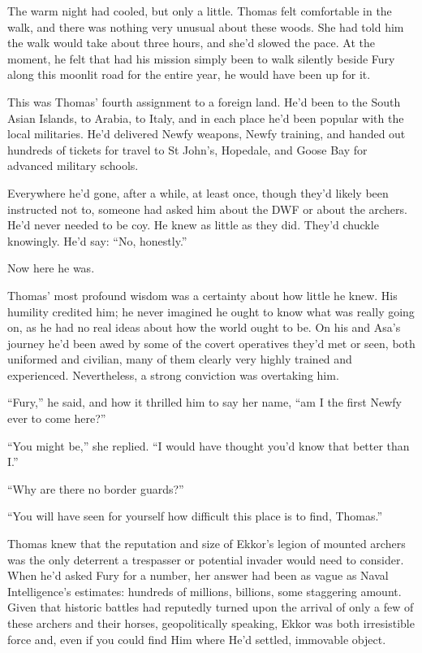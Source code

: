 \documentclass[11pt,a5paper]{article}
\begin{document}
The warm night had cooled, but only a little. Thomas felt comfortable in the walk, and there was nothing very unusual about these woods. She had told him the walk would take about three hours, and she'd slowed the pace. At the moment, he felt that had his mission simply been to walk silently beside Fury along this moonlit road for the entire year, he would have been up for it.

This was Thomas' fourth assignment to a foreign land. He'd been to the South Asian Islands, to Arabia, to Italy, and in each place he'd been popular with the local militaries. He'd delivered Newfy weapons, Newfy training, and handed out hundreds of tickets for travel to St John's, Hopedale, and Goose Bay for advanced military schools.

Everywhere he'd gone, after a while, at least once, though they'd likely been instructed not to, someone had asked him about the DWF or about the archers. He'd never needed to be coy. He knew as little as they did. They'd chuckle knowingly. He'd say: ``No, honestly.''

Now here he was.

Thomas' most profound wisdom was a certainty about how little he knew. His humility credited him; he never imagined he ought to know what was really going on, as he had no real ideas about how the world ought to be. On his and Asa's journey he'd been awed by some of the covert operatives they'd met or seen, both uniformed and civilian, many of them clearly very highly trained and experienced. Nevertheless, a strong conviction was overtaking him.

``Fury,'' he said, and how it thrilled him to say her name, ``am I the first Newfy ever to come here?''

``You might be,'' she replied. ``I would have thought you'd know that better than I.''

``Why are there no border guards?''

``You will have seen for yourself how difficult this place is to find, Thomas.''

Thomas knew that the reputation and size of Ekkor's legion of mounted archers was the only deterrent a trespasser or potential invader would need to consider. When he'd asked Fury for a number, her answer had been as vague as Naval Intelligence's estimates: hundreds of millions, billions, some staggering amount. Given that historic battles had reputedly turned upon the arrival of only a few of these archers and their horses, geopolitically speaking, Ekkor was both irresistible force and, even if you could find Him where He'd settled, immovable object.
\end{document}
